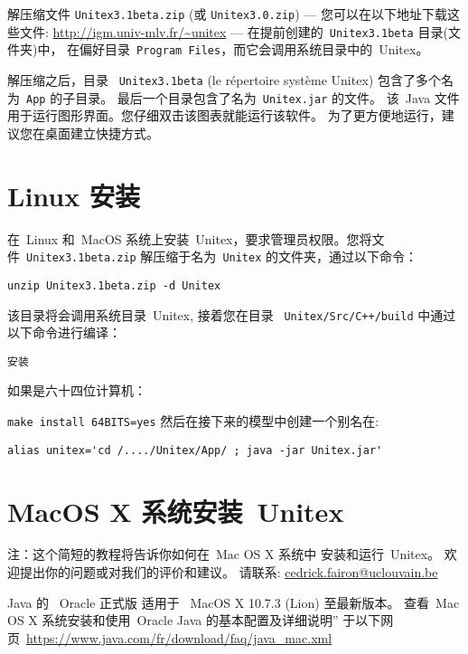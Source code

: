 \bigskip
\noindent 解压缩文件  \verb+Unitex3.1beta.zip+ (或 \verb+Unitex3.0.zip+)
--- 您可以在以下地址下载这些文件: \url{http://igm.univ-mlv.fr/~unitex} ---
在提前创建的\ \verb+Unitex3.1beta+ 目录(文件夹)中，
在偏好目录\ \verb+Program Files+，而它会调用系统目录中的\ Unitex。

\bigskip
\noindent 解压缩之后，目录 \ \verb+Unitex3.1beta+
(le répertoire système Unitex)  包含了多个名为\ \verb+App+ 的子目录。 最后一个目录包含了名为\ \verb+Unitex.jar+ 的文件。
 该\ Java 文件用于运行图形界面。您仔细双击该图表就能运行该软件。
为了更方便地运行，建议您在桌面建立快捷方式。

\section{Linux 安装}
在\ Linux 和\ MacOS 系统上安装\ Unitex，要求管理员权限。您将文件\ \verb+Unitex3.1beta.zip+ 解压缩于名为\ \verb+Unitex+ 的文件夹，通过以下命令：


\bigskip \noindent \verb$unzip Unitex3.1beta.zip -d Unitex$

\bigskip
\noindent 该目录将会调用系统目录\ Unitex,
接着您在目录 \ \verb|Unitex/Src/C++/build| 中通过以下命令进行编译：


\bigskip \verb+安装+

\bigskip
\noindent 如果是六十四位计算机：
 
\bigskip \verb+make install 64BITS=yes+
\bigskip
\noindent 然后在接下来的模型中创建一个别名在:

\bigskip \verb$alias unitex='cd /..../Unitex/App/ ; java -jar Unitex.jar'$


\section{MacOS X 系统安装\ Unitex}
\label{section-macos-install}
\noindent 注：这个简短的教程将告诉你如何在\ Mac OS X 系统中 安装和运行\ Unitex。
欢迎提出你的问题或对我们的评价和建议。
\noindent 请联系: \url{cedrick.fairon@uclouvain.be}


\bigskip
\noindent Java 的 \ Oracle 正式版 适用于 \ MacOS X 10.7.3 (Lion) 至最新版本。
	查看\ Mac OS X 系统安装和使用\ Oracle Java 的基本配置及详细说明'' 于以下网页\  \url{https://www.java.com/fr/download/faq/java_mac.xml}

	

